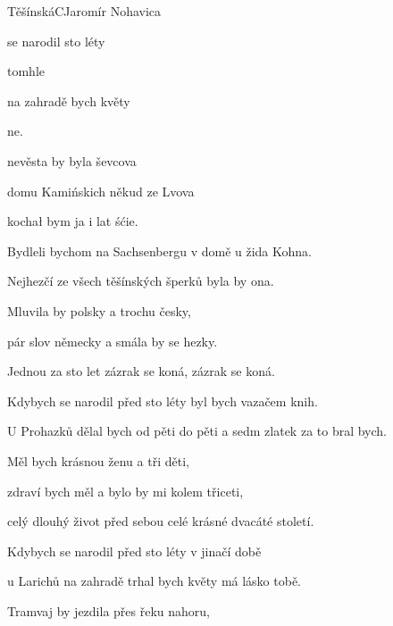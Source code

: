 \begin{song}{Těšínská}{C}{Jaromír Nohavica}

\begin{SBVerse}

 se narodil  sto léty 

 tomhle   {}

 na zahradě  bych květy

 ne.

 nevěsta by byla  ševcova

 domu Kamińskich někud ze Lvova

kochał bym ja i   lat śćie.

\end{SBVerse}

\begin{SBVerse}

Bydleli bychom na Sachsenbergu v domě u žida Kohna.

Nejhezčí ze všech těšínských šperků byla by ona.

Mluvila by polsky a trochu česky,

pár slov německy a smála by se hezky.

Jednou za sto let zázrak se koná, zázrak se koná.

\end{SBVerse}

\begin{SBVerse}

Kdybych se narodil před sto léty byl bych vazačem knih.

U Prohazků dělal bych od pěti do pěti a sedm zlatek za to bral bych.

Měl bych krásnou ženu a tři děti,

zdraví bych měl a bylo by mi kolem třiceti,

celý dlouhý život před sebou celé krásné dvacáté století.

\end{SBVerse}

\begin{SBVerse}

Kdybych se narodil před sto léty v jinačí době

u Larichů na zahradě trhal bych květy má lásko tobě.

Tramvaj by jezdila přes řeku nahoru,


\end{SBVerse}
\end{song}
